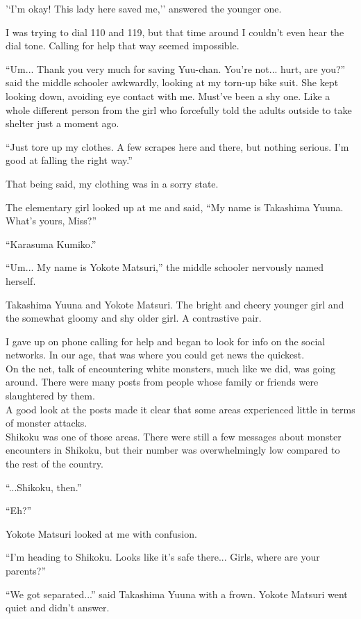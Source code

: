 '`I'm okay! This lady here saved me,'' answered the younger one.

I was trying to dial 110 and 119, but that time around I couldn't even hear the dial tone. Calling for help that way seemed impossible.

``Um... Thank you very much for saving Yuu-chan. You're not... hurt, are you?'' said the middle schooler awkwardly, looking at my torn-up bike suit. She kept looking down, avoiding eye contact with me. Must've been a shy one. Like a whole different person from the girl who forcefully told the adults outside to take shelter just a moment ago.

``Just tore up my clothes. A few scrapes here and there, but nothing serious. I'm good at falling the right way.''

That being said, my clothing was in a sorry state.

The elementary girl looked up at me and said, ``My name is Takashima Yuuna. What's yours, Miss?''

``Karasuma Kumiko.''

``Um... My name is Yokote Matsuri,'' the middle schooler nervously named herself.

Takashima Yuuna and Yokote Matsuri. The bright and cheery younger girl and the somewhat gloomy and shy older girl. A contrastive pair.

I gave up on phone calling for help and began to look for info on the social networks. In our age, that was where you could get news the quickest. \\
On the net, talk of encountering white monsters, much like we did, was going around. There were many posts from people whose family or friends were slaughtered by them. \\
A good look at the posts made it clear that some areas experienced little in terms of monster attacks. \\
Shikoku was one of those areas. There were still a few messages about monster encounters in Shikoku, but their number was overwhelmingly low compared to the rest of the country.

``...Shikoku, then.''

``Eh?''

Yokote Matsuri looked at me with confusion.

``I'm heading to Shikoku. Looks like it's safe there... Girls, where are your parents?''

``We got separated...'' said Takashima Yuuna with a frown. Yokote Matsuri went quiet and didn't answer.

